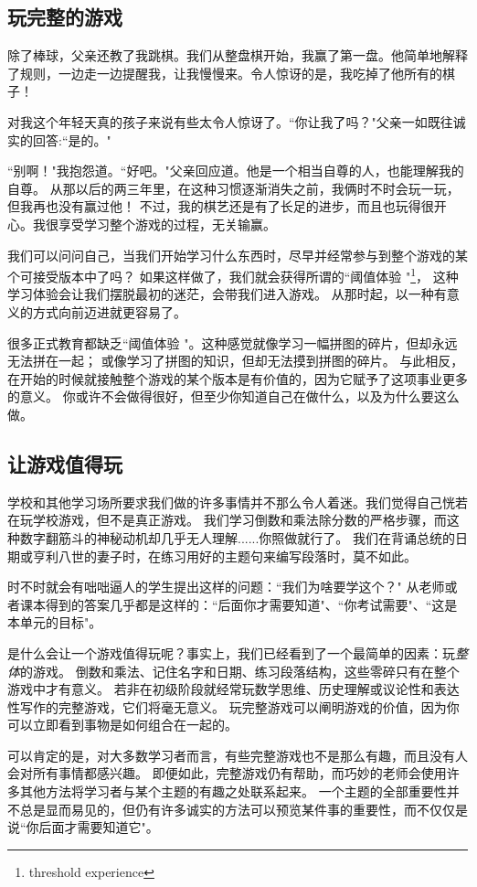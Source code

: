 \subsection*{玩完整的游戏}
除了棒球，父亲还教了我跳棋。我们从整盘棋开始，我赢了第一盘。他简单地解释了规则，一边走一边提醒我，让我慢慢来。令人惊讶的是，我吃掉了他所有的棋子！

对我这个年轻天真的孩子来说有些太令人惊讶了。``你让我了吗？"父亲一如既往诚实的回答:``是的。"

``别啊！"我抱怨道。``好吧。"父亲回应道。他是一个相当自尊的人，也能理解我的自尊。
从那以后的两三年里，在这种习惯逐渐消失之前，我俩时不时会玩一玩，但我再也没有赢过他！
不过，我的棋艺还是有了长足的进步，而且也玩得很开心。我很享受学习整个游戏的过程，无关输赢。

我们可以问问自己，当我们开始学习什么东西时，尽早并经常参与到整个游戏的某个可接受版本中了吗？
如果这样做了，我们就会获得所谓的``阈值体验 "\footnote{threshold experience}，
这种学习体验会让我们摆脱最初的迷茫，会带我们进入游戏。
从那时起，以一种有意义的方式向前迈进就更容易了。

很多正式教育都缺乏``阈值体验 "。这种感觉就像学习一幅拼图的碎片，但却永远无法拼在一起；
或像学习了拼图的知识，但却无法摸到拼图的碎片。
与此相反，在开始的时候就接触整个游戏的某个版本是有价值的，因为它赋予了这项事业更多的意义。
你或许不会做得很好，但至少你知道自己在做什么，以及为什么要这么做。

\subsection*{让游戏值得玩}
学校和其他学习场所要求我们做的许多事情并不那么令人着迷。我们觉得自己恍若在玩学校游戏，但不是真正游戏。
我们学习倒数和乘法除分数的严格步骤，而这种数字翻筋斗的神秘动机却几乎无人理解......你照做就行了。
我们在背诵总统的日期或亨利八世的妻子时，在练习用好的主题句来编写段落时，莫不如此。

时不时就会有咄咄逼人的学生提出这样的问题：``我们为啥要学这个？"
从老师或者课本得到的答案几乎都是这样的：``后面你才需要知道"、``你考试需要"、``这是本单元的目标"。

是什么会让一个游戏值得玩呢？事实上，我们已经看到了一个最简单的因素：玩\textit{整体}的游戏。
倒数和乘法、记住名字和日期、练习段落结构，这些零碎只有在整个游戏中才有意义。
若非在初级阶段就经常玩数学思维、历史理解或议论性和表达性写作的完整游戏，它们将毫无意义。
玩完整游戏可以阐明游戏的价值，因为你可以立即看到事物是如何组合在一起的。

可以肯定的是，对大多数学习者而言，有些完整游戏也不是那么有趣，而且没有人会对所有事情都感兴趣。
即便如此，完整游戏仍有帮助，而巧妙的老师会使用许多其他方法将学习者与某个主题的有趣之处联系起来。
一个主题的全部重要性并不总是显而易见的，但仍有许多诚实的方法可以预览某件事的重要性，而不仅仅是说``你后面才需要知道它"。

